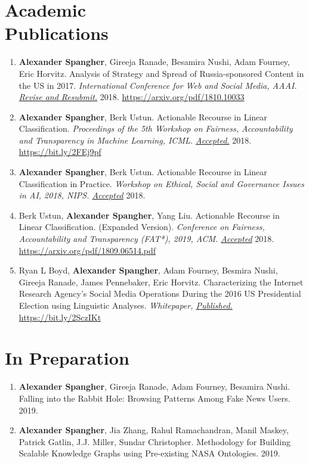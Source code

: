 \documentclass[margin]{res}
\begin{document}
\begin{resume}
\section{Academic\\Publications}
\begin{enumerate}
	\item \textbf{Alexander Spangher}, Gireeja Ranade, Besamira Nushi, Adam Fourney, Eric Horvitz. Analysis of Strategy and Spread of Russia-sponsored Content in the US in 2017. \textit{International Conference for Web and Social Media, AAAI. \underline{Revise and Resubmit.}} 2018. \url{https://arxiv.org/pdf/1810.10033}
	\item \textbf{Alexander Spangher}, Berk Ustun. Actionable Recourse in Linear Classification. \textit{Proceedings of the 5th Workshop on Fairness, Accountability and Transparency in Machine Learning, ICML. \underline{Accepted.}} 2018. \url{https://bit.ly/2FEj9pf}
	\item \textbf{Alexander Spangher}, Berk Ustun. Actionable Recourse in Linear Classification in Practice. \textit{Workshop on Ethical, Social and Governance Issues in AI, 2018, NIPS. \underline{Accepted}} 2018. 
	\item Berk Ustun, \textbf{Alexander Spangher}, Yang Liu. Actionable Recourse in Linear Classification. (Expanded Version). \textit{Conference on Fairness, Accountability and Transparency (FAT*), 2019, ACM. \underline{Accepted}} 2018. \url{https://arxiv.org/pdf/1809.06514.pdf}
	\item Ryan L Boyd, \textbf{Alexander Spangher}, Adam Fourney, Besmira Nushi, Gireeja Ranade, James Pennebaker, Eric Horvitz. Characterizing the Internet Research Agency’s Social Media Operations During the 2016 US Presidential Election using Linguistic Analyses. \textit{Whitepaper, \underline{Published.}} \url{https://bit.ly/2SczIKt}
\end{enumerate}

\section{In Preparation}
\begin{enumerate}
	\item \textbf{Alexander Spangher}, Gireeja Ranade, Adam Fourney, Besamira Nushi. Falling into the Rabbit Hole: Browsing Patterns Among Fake News Users. 2019.
	\item \textbf{Alexander Spangher}, Jia Zhang, Rahul Ramachandran, Manil Maskey, Patrick Gatlin, J.J. Miller, Sundar Christopher. Methodology for Building Scalable Knowledge Graphs using Pre-existing NASA Ontologies. 2019.
\end{enumerate}


\end{resume}
\end{document}

